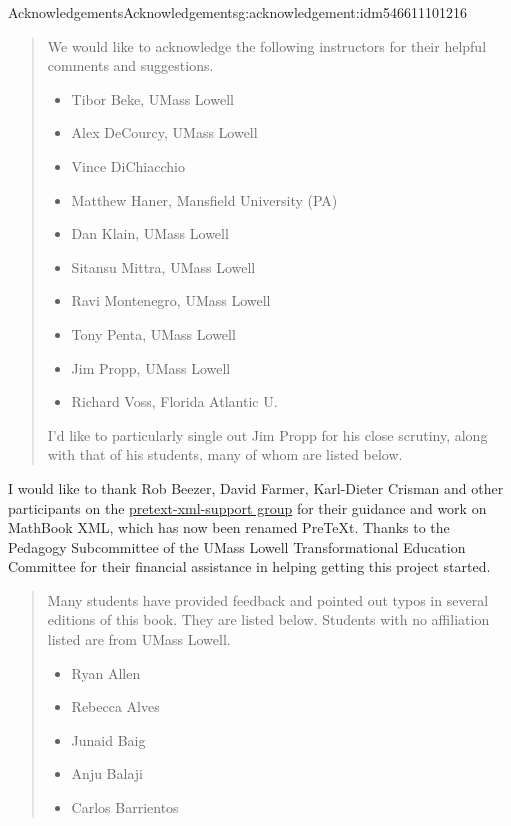 \documentclass[oneside,10pt,]{book}
\numberwithin{equation}{section}
\begin{document}
\begin{acknowledgement}{Acknowledgements}{}{Acknowledgements}{}{}{g:acknowledgement:idm546611101216}
\begin{quote}%
We would like to acknowledge the following instructors for their helpful comments and suggestions.%
\begin{multicols}{2}
\begin{itemize}[label=\textbullet]
\item{}Tibor Beke, UMass Lowell%
\item{}Alex DeCourcy, UMass Lowell%
\item{}Vince DiChiacchio%
\item{}Matthew Haner, Mansfield University (PA)%
\item{}Dan Klain, UMass Lowell%
\item{}Sitansu Mittra, UMass Lowell%
\item{}Ravi Montenegro, UMass Lowell%
\item{}Tony Penta, UMass Lowell%
\item{}Jim Propp, UMass Lowell%
\item{}Richard Voss, Florida Atlantic U.%
\end{itemize}
\end{multicols}
I'd like to particularly single out Jim Propp for his close scrutiny, along with that of his students, many of whom are listed below.%
\end{quote}
I would like to thank Rob Beezer, David Farmer, Karl-Dieter Crisman and other participants on the \href{https://groups.google.com/forum/m/?fromgroups\#!forum/pretext-support}{pretext-xml-support group} for their guidance and work on MathBook XML, which has now been renamed PreTeXt.  Thanks to the Pedagogy Subcommittee of the UMass Lowell Transformational Education Committee for their financial assistance in helping getting this project started.%
\begin{quote}%
Many students have provided feedback and pointed out typos in several editions of this book. They are listed below. Students with no affiliation listed are from UMass Lowell.%
\begin{multicols}{2}
\begin{itemize}[label=\textbullet]
\item{}Ryan Allen%
\item{}Rebecca Alves%
\item{}Junaid Baig%
\item{}Anju Balaji%
\item{}Carlos Barrientos%

\end{itemize}
\end{multicols}
\end{quote}
\end{acknowledgement}
\end{document}
